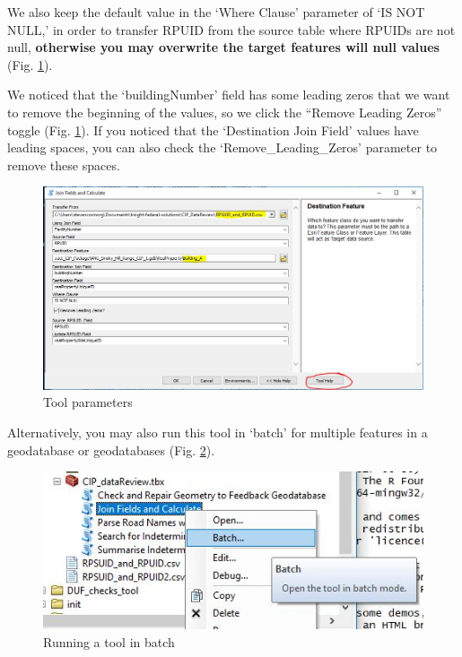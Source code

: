 \documentclass[openany]{book}
\theoremstyle{definition}
\theoremstyle{definition}
\theoremstyle{definition}
\theoremstyle{remark}
\begin{document}
We also keep the default value in the `Where Clause' parameter of `IS
NOT NULL,' in order to transfer RPUID from the source table where RPUIDs
are not null, \textbf{otherwise you may overwrite the target features
will null values} (Fig. \ref{fig:jcparams}).

We noticed that the `buildingNumber' field has some leading zeros that
we want to remove the beginning of the values, so we click the ``Remove
Leading Zeros'' toggle (Fig. \ref{fig:jcparams}). If you noticed that
the `Destination Join Field' values have leading spaces, you can also
check the `Remove\_Leading\_Zeros' parameter to remove these spaces.

\begin{figure}[H]

{\centering \includegraphics{figures/joinCalc-toolparams} 

}

\caption{Tool parameters}\label{fig:jcparams}
\end{figure}

Alternatively, you may also run this tool in `batch' for multiple
features in a geodatabase or geodatabases (Fig. \ref{fig:batch}).

\begin{figure}[H]

{\centering \includegraphics{figures/joinCalc-batch} 

}

\caption{Running a tool in batch}\label{fig:batch}
\end{figure}
\end{document}
